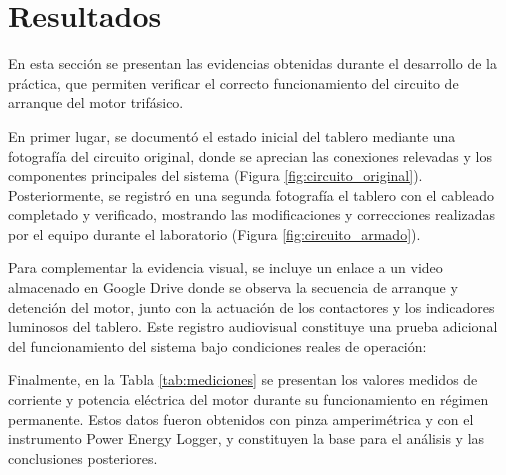 \section{Resultados}

En esta sección se presentan las evidencias obtenidas durante el desarrollo de la práctica, que permiten verificar el correcto funcionamiento del circuito de arranque del motor trifásico.

En primer lugar, se documentó el estado inicial del tablero mediante una fotografía del circuito original, donde se aprecian las conexiones relevadas y los componentes principales del sistema (Figura \ref{fig:circuito_original}). Posteriormente, se registró en una segunda fotografía el tablero con el cableado completado y verificado, mostrando las modificaciones y correcciones realizadas por el equipo durante el laboratorio (Figura \ref{fig:circuito_armado}).

Para complementar la evidencia visual, se incluye un enlace a un video almacenado en Google Drive donde se observa la secuencia de arranque y detención del motor, junto con la actuación de los contactores y los indicadores luminosos del tablero. Este registro audiovisual constituye una prueba adicional del funcionamiento del sistema bajo condiciones reales de operación:


Finalmente, en la Tabla \ref{tab:mediciones} se presentan los valores medidos de corriente y potencia eléctrica del motor durante su funcionamiento en régimen permanente. Estos datos fueron obtenidos con pinza amperimétrica y con el instrumento Power Energy Logger, y constituyen la base para el análisis y las conclusiones posteriores.



